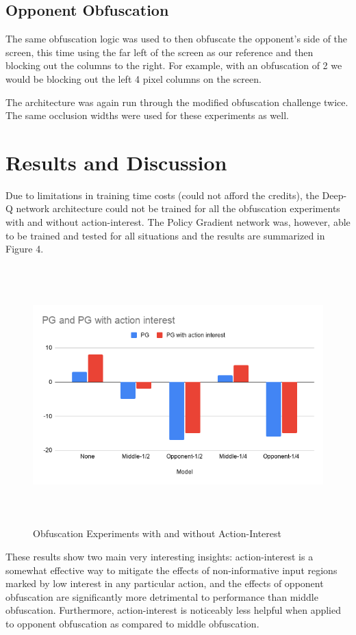 \documentclass{article}
\begin{document}
\subsection{Opponent Obfuscation}
The same obfuscation logic was used to then obfuscate the opponent's side of the screen, this time using the far left of the screen
as our reference and then blocking out the columns to the right. For example, with an obfuscation of 2 we would be blocking out the
left 4 pixel columns on the screen.

The architecture was again run through the modified obfuscation challenge twice. The same occlusion widths were used for these experiments as well.


\section{Results and Discussion}

Due to limitations in training time costs (could not afford the credits), the Deep-Q network architecture could not be trained for all the
obfuscation experiments with and without action-interest. The Policy Gradient network was, however, able to be trained and tested for all situations
and the results are summarized in Figure 4.

\begin{figure}
  \centering
  \includegraphics[width=15cm, height=10cm]{ai_plot.png}
  \caption{Obfuscation Experiments with and without Action-Interest} 
  \label{fig:actioninterest}
\end{figure}

These results show two main very interesting insights: action-interest is a somewhat effective way to mitigate the effects of
non-informative input regions marked by low interest in any particular action, and the effects of opponent obfuscation are significantly
more detrimental to performance than middle obfuscation. Furthermore, action-interest is noticeably less helpful when applied to opponent
obfuscation as compared to middle obfuscation.
\end{document}
